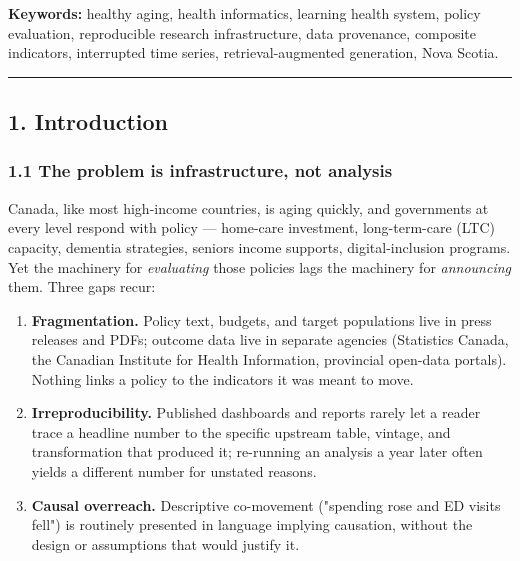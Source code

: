 \documentclass[
  11pt,
]{article}
\providecommand{\tightlist}{%
  \setlength{\itemsep}{0pt}\setlength{\parskip}{0pt}}
\begin{document}
\textbf{Keywords:} healthy aging, health informatics, learning health
system, policy evaluation, reproducible research infrastructure, data
provenance, composite indicators, interrupted time series,
retrieval-augmented generation, Nova Scotia.

\begin{center}\rule{0.5\linewidth}{0.5pt}\end{center}

\hypertarget{1-introduction}{%
\subsection{1. Introduction}\label{1-introduction}}

\hypertarget{11-the-problem-is-infrastructure-not-analysis}{%
\subsubsection{1.1 The problem is infrastructure, not
analysis}\label{11-the-problem-is-infrastructure-not-analysis}}

Canada, like most high-income countries, is aging quickly, and
governments at every level respond with policy --- home-care investment,
long-term-care (LTC) capacity, dementia strategies,
seniors\textquotesingle{} income supports, digital-inclusion programs.
Yet the machinery for \emph{evaluating} those policies lags the
machinery for \emph{announcing} them. Three gaps recur:

\begin{enumerate}
\def\labelenumi{\arabic{enumi}.}
\tightlist
\item
  \textbf{Fragmentation.} Policy text, budgets, and target populations
  live in press releases and PDFs; outcome data live in separate
  agencies (Statistics Canada, the Canadian Institute for Health
  Information, provincial open-data portals). Nothing links a policy to
  the indicators it was meant to move.
\item
  \textbf{Irreproducibility.} Published dashboards and reports rarely
  let a reader trace a headline number to the specific upstream table,
  vintage, and transformation that produced it; re-running an analysis a
  year later often yields a different number for unstated reasons.
\item
  \textbf{Causal overreach.} Descriptive co-movement ("spending rose and
  ED visits fell") is routinely presented in language implying
  causation, without the design or assumptions that would justify it.
\end{enumerate}
\end{document}
